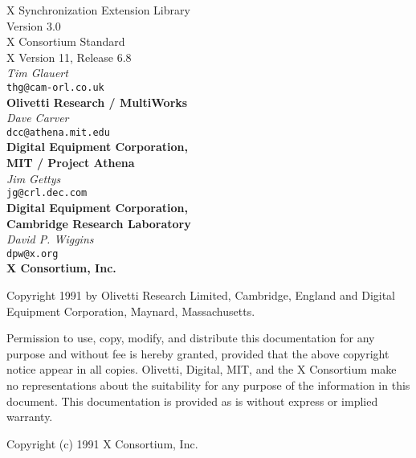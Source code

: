 \begin{center}

{\large X Synchronization Extension Library}\\[10pt]
{\large Version 3.0}\\[15pt]
{\large X Consortium Standard}\\[15pt]
{\large X Version 11, Release 6.8}\\[15pt]
{\it Tim Glauert}\\[0pt]
{\tt thg@cam-orl.co.uk}\\[0pt]
{\bf Olivetti Research / MultiWorks}\\[5pt]
{\it Dave Carver}\\[0pt]
{\tt dcc@athena.mit.edu}\\[0pt]
{\bf Digital Equipment Corporation,}\\[0pt]
{\bf MIT / Project Athena}\\[5pt]
{\it Jim Gettys}\\[0pt]
{\tt jg@crl.dec.com}\\[0pt]
{\bf Digital Equipment Corporation,}\\[0pt]
{\bf Cambridge Research Laboratory}\\[5pt]
{\it David P. Wiggins}\\[0pt]
{\tt dpw@x.org}\\[0pt]
{\bf X Consortium, Inc.}\\[0pt]

\end {center}

Copyright 1991 by Olivetti Research Limited, Cambridge, England and
Digital Equipment Corporation, Maynard, Massachusetts.

{\small Permission to use, copy, modify, and distribute this documentation
for any purpose and without fee is hereby granted, provided that the above
copyright notice appear in all copies. Olivetti, Digital, MIT, and the
X Consortium
make no representations about the suitability for any purpose of the
information in this document. This documentation is provided as is without
express or implied warranty.}

Copyright (c) 1991 X Consortium, Inc.

